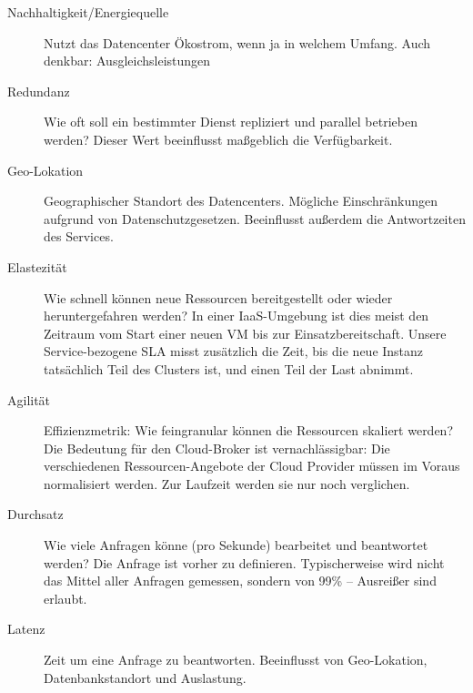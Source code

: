 \begin{description}
	
	\item[Nachhaltigkeit/Energiequelle] Nutzt das Datencenter Ökostrom, wenn ja in welchem Umfang. Auch denkbar: Ausgleichsleistungen
	

	\item[Redundanz] Wie oft soll ein bestimmter Dienst repliziert und parallel betrieben werden? Dieser Wert beeinflusst maßgeblich die Verfügbarkeit.
%	
%	
	
	\item[Geo-Lokation] Geographischer Standort des Datencenters. Mögliche Einschränkungen aufgrund von Datenschutzgesetzen. Beeinflusst außerdem die Antwortzeiten des Services.

	\item[Elastezität] Wie schnell können neue Ressourcen bereitgestellt oder wieder heruntergefahren werden? In einer IaaS-Umgebung ist dies meist den Zeitraum vom Start einer neuen VM bis zur Einsatzbereitschaft. Unsere Service-bezogene SLA misst zusätzlich die Zeit, bis die neue Instanz tatsächlich Teil des Clusters ist, und einen Teil der Last abnimmt.
	
	\item[Agilität] Effizienzmetrik: Wie feingranular können die Ressourcen skaliert werden? Die Bedeutung für den Cloud-Broker ist vernachlässigbar:  Die verschiedenen Ressourcen-Angebote der Cloud Provider müssen im Voraus normalisiert werden. Zur Laufzeit werden sie nur noch verglichen.
	
	\item[Durchsatz] Wie viele Anfragen könne (pro Sekunde) bearbeitet und beantwortet werden? Die Anfrage ist vorher zu definieren. Typischerweise wird nicht das Mittel aller Anfragen gemessen, sondern von 99\% -- Ausreißer sind erlaubt.
	
	\item[Latenz] Zeit um eine Anfrage zu beantworten. Beeinflusst von Geo-Lokation, Datenbankstandort und Auslastung.
	

\end{description}
